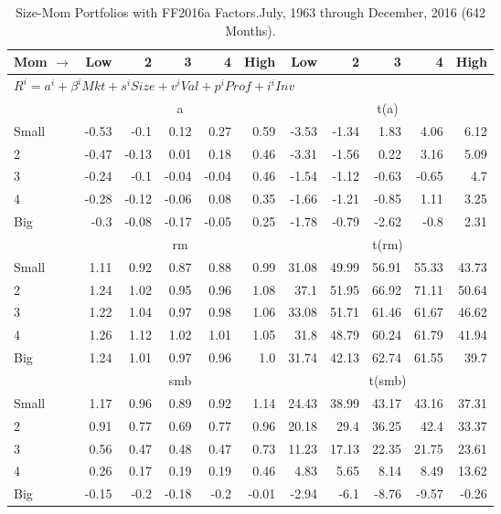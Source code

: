 
\begin{table}[!ht]
\centering
\caption{Size-Mom Portfolios with FF2016a Factors.\footnotesize{July, 1963 through December, 2016 (642 Months).}}
\begin{tabular}{lrrrrrrrrrr}
  \toprule
  Mom $\rightarrow$ & Low & 2 & 3 & 4 & High & Low & 2 & 3 & 4 & High \\ 
  \toprule
  \multicolumn{9}{l}{$R^i=a^i+\beta^iMkt+s^iSize+v^iVal+p^iProf+i^iInv$} \\

  

      & \multicolumn{5}{c}{a} & \multicolumn{5}{c}{t(a)} \\
    \cmidrule(r){2-6} \cmidrule(r){7-11}
      Small  & -0.53  & -0.1  & 0.12  & 0.27  & 0.59   & -3.53  & -1.34  & 1.83  & 4.06  & 6.12  \\
          2  & -0.47  & -0.13  & 0.01  & 0.18  & 0.46   & -3.31  & -1.56  & 0.22  & 3.16  & 5.09  \\
          3  & -0.24  & -0.1  & -0.04  & -0.04  & 0.46   & -1.54  & -1.12  & -0.63  & -0.65  & 4.7  \\
          4  & -0.28  & -0.12  & -0.06  & 0.08  & 0.35   & -1.66  & -1.21  & -0.85  & 1.11  & 3.25  \\
      Big    & -0.3  & -0.08  & -0.17  & -0.05  & 0.25   & -1.78  & -0.79  & -2.62  & -0.8  & 2.31  \\

  

      & \multicolumn{5}{c}{rm} & \multicolumn{5}{c}{t(rm)} \\
    \cmidrule(r){2-6} \cmidrule(r){7-11}
      Small  & 1.11  & 0.92  & 0.87  & 0.88  & 0.99   & 31.08  & 49.99  & 56.91  & 55.33  & 43.73  \\
          2  & 1.24  & 1.02  & 0.95  & 0.96  & 1.08   & 37.1  & 51.95  & 66.92  & 71.11  & 50.64  \\
          3  & 1.22  & 1.04  & 0.97  & 0.98  & 1.06   & 33.08  & 51.71  & 61.46  & 61.67  & 46.62  \\
          4  & 1.26  & 1.12  & 1.02  & 1.01  & 1.05   & 31.8  & 48.79  & 60.24  & 61.79  & 41.94  \\
      Big    & 1.24  & 1.01  & 0.97  & 0.96  & 1.0   & 31.74  & 42.13  & 62.74  & 61.55  & 39.7  \\

  

      & \multicolumn{5}{c}{smb} & \multicolumn{5}{c}{t(smb)} \\
    \cmidrule(r){2-6} \cmidrule(r){7-11}
      Small  & 1.17  & 0.96  & 0.89  & 0.92  & 1.14   & 24.43  & 38.99  & 43.17  & 43.16  & 37.31  \\
          2  & 0.91  & 0.77  & 0.69  & 0.77  & 0.96   & 20.18  & 29.4  & 36.25  & 42.4  & 33.37  \\
          3  & 0.56  & 0.47  & 0.48  & 0.47  & 0.73   & 11.23  & 17.13  & 22.35  & 21.75  & 23.61  \\
          4  & 0.26  & 0.17  & 0.19  & 0.19  & 0.46   & 4.83  & 5.65  & 8.14  & 8.49  & 13.62  \\
      Big    & -0.15  & -0.2  & -0.18  & -0.2  & -0.01   & -2.94  & -6.1  & -8.76  & -9.57  & -0.26  \\


\end{tabular}
\end{table}
